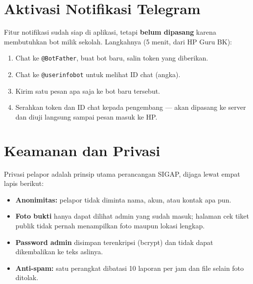 \documentclass[12pt,a4paper]{article}
\begin{document}
\section{Aktivasi Notifikasi Telegram}
Fitur notifikasi sudah siap di aplikasi, tetapi \textbf{belum dipasang} karena
membutuhkan bot milik sekolah. Langkahnya (5 menit, dari HP Guru BK):
\begin{enumerate}[nosep]
  \item Chat ke \texttt{@BotFather}, buat bot baru, salin token yang diberikan.
  \item Chat ke \texttt{@userinfobot} untuk melihat ID chat (angka).
  \item Kirim satu pesan apa saja ke bot baru tersebut.
  \item Serahkan token dan ID chat kepada pengembang --- akan dipasang ke server
        dan diuji langsung sampai pesan masuk ke HP.
\end{enumerate}

\section{Keamanan dan Privasi}
Privasi pelapor adalah prinsip utama perancangan SIGAP, dijaga lewat empat
lapis berikut:
\begin{itemize}
  \item \textbf{Anonimitas:} pelapor tidak diminta nama, akun, atau kontak apa pun.
  \item \textbf{Foto bukti} hanya dapat dilihat admin yang sudah masuk; halaman
        cek tiket publik tidak pernah menampilkan foto maupun lokasi lengkap.
  \item \textbf{Password admin} disimpan terenkripsi (bcrypt) dan tidak dapat
        dikembalikan ke teks aslinya.
  \item \textbf{Anti-spam:} satu perangkat dibatasi 10 laporan per jam dan file
        selain foto ditolak.
\end{itemize}
\end{document}
